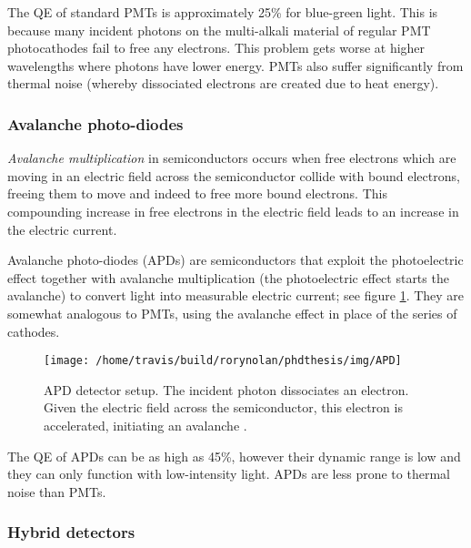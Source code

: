 \documentclass[12pt,]{book}
\theoremstyle{definition}
\theoremstyle{definition}
\theoremstyle{definition}
\theoremstyle{remark}
\let\BeginKnitrBlock\begin \let\EndKnitrBlock\end
\begin{document}
The QE of standard PMTs is approximately 25\% for blue-green light. This
is because many incident photons on the multi-alkali material of regular
PMT photocathodes fail to free any electrons. This problem gets worse at
higher wavelengths where photons have lower energy. PMTs also suffer
significantly from thermal noise (whereby dissociated electrons are
created due to heat energy).

\subsubsection{Avalanche photo-diodes}\label{avalanche-photo-diodes}

\BeginKnitrBlock{definition}
\protect\hypertarget{def:unnamed-chunk-7}{}{\label{def:unnamed-chunk-7}
}\emph{Avalanche multiplication} in semiconductors occurs when free
electrons which are moving in an electric field across the semiconductor
collide with bound electrons, freeing them to move and indeed to free
more bound electrons. This compounding increase in free electrons in the
electric field leads to an increase in the electric current.
\EndKnitrBlock{definition}

Avalanche photo-diodes (APDs) are semiconductors that exploit the
photoelectric effect together with avalanche multiplication (the
photoelectric effect starts the avalanche) to convert light into
measurable electric current; see figure \ref{fig:APD}. They are somewhat
analogous to PMTs, using the avalanche effect in place of the series of
cathodes.





\begin{figure}

\texttt{[image: /home/travis/build/rorynolan/phdthesis/img/APD]} \hfill{}

\caption{APD detector setup. The incident photon dissociates an
electron. Given the electric field across the semiconductor, this
electron is accelerated, initiating an avalanche \citep{LeicaDetectors}.}\label{fig:APD}
\end{figure}

The QE of APDs can be as high as 45\%, however their dynamic range is
low and they can only function with low-intensity light. APDs are less
prone to thermal noise than PMTs.

\subsubsection{Hybrid detectors}\label{HyDs}
\end{document}
